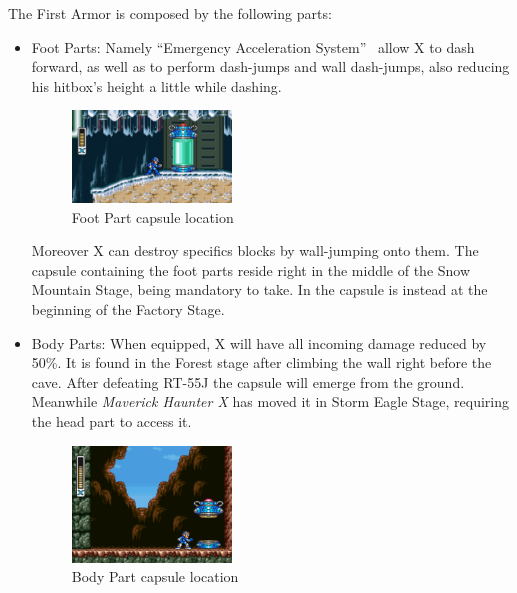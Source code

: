 The First Armor is composed by the following parts:
\begin{itemize}
	\item Foot Parts:	Namely ``Emergency Acceleration System''~\cite{X:Manual} allow X to dash forward, as well as to perform dash-jumps and wall dash-jumps, also reducing his hitbox's height a little while dashing.
	 \begin{figure}[htp]
		\centering
		\includegraphics[width=0.4\textwidth]{figures/X1/Chill_penguin/Armor_foot.jpg}
		\caption{Foot Part capsule location}
	\end{figure}
	Moreover X can destroy specifics blocks by wall-jumping onto them. The capsule containing the foot parts reside right in the middle of the Snow Mountain Stage, being mandatory to take. In \mhx the capsule is instead at the beginning of the Factory Stage.
	
	
	\item Body Parts: When equipped, X will have all incoming damage reduced by 50\%. It is found in the Forest stage after climbing the wall right before the cave. After defeating RT-55J the capsule will emerge from the ground. Meanwhile \textit{Maverick Haunter X} has moved it in Storm Eagle Stage, requiring the head part to access it.
	\begin{figure}[htp]
		\centering
		\includegraphics[width=0.4\textwidth]{figures/X1/Sting_chameleon/Sting_armor_capsule.jpg}
		\caption{Body Part capsule location}
	\end{figure}
	

\end{itemize}
